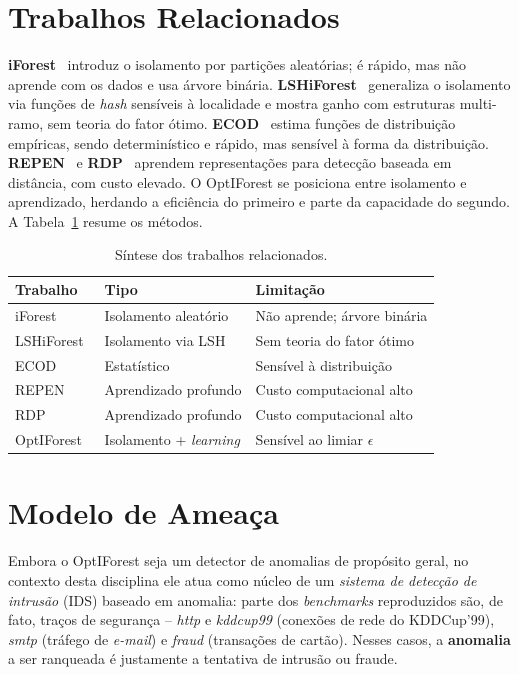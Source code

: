 \documentclass[conference]{IEEEtran}
\begin{document}
\section{Trabalhos Relacionados}

\textbf{iForest}~\cite{iforest} introduz o isolamento por parti\c{c}\~oes
aleat\'orias; \'e r\'apido, mas n\~ao aprende com os dados e usa \'arvore bin\'aria.
\textbf{LSHiForest}~\cite{lshiforest} generaliza o isolamento via fun\c{c}\~oes de
\emph{hash} sens\'iveis \`a localidade e mostra ganho com estruturas multi-ramo,
sem teoria do fator \'otimo. \textbf{ECOD}~\cite{ecod} estima fun\c{c}\~oes de
distribui\c{c}\~ao emp\'iricas, sendo determin\'istico e r\'apido, mas sens\'ivel \`a
forma da distribui\c{c}\~ao. \textbf{REPEN}~\cite{repen} e \textbf{RDP}~\cite{rdp}
aprendem representa\c{c}\~oes para detec\c{c}\~ao baseada em dist\^ancia, com custo
elevado. O OptIForest se posiciona entre isolamento e aprendizado, herdando a
efici\^encia do primeiro e parte da capacidade do segundo. A
Tabela~\ref{tab:related} resume os m\'etodos.

\begin{table}[h]
\centering
\caption{S\'intese dos trabalhos relacionados.}
\label{tab:related}
\footnotesize
\begin{tabular}{llp{2.4cm}}
\toprule
\textbf{Trabalho} & \textbf{Tipo} & \textbf{Limita\c{c}\~ao} \\
\midrule
iForest~\cite{iforest}      & Isolamento aleat\'orio & N\~ao aprende; \'arvore bin\'aria \\
LSHiForest~\cite{lshiforest}& Isolamento via LSH     & Sem teoria do fator \'otimo \\
ECOD~\cite{ecod}            & Estat\'istico          & Sens\'ivel \`a distribui\c{c}\~ao \\
REPEN~\cite{repen}          & Aprendizado profundo   & Custo computacional alto \\
RDP~\cite{rdp}              & Aprendizado profundo   & Custo computacional alto \\
OptIForest~\cite{optiforest}& Isolamento + \emph{learning} & Sens\'ivel ao limiar $\epsilon$ \\
\bottomrule
\end{tabular}
\end{table}

\section{Modelo de Ameaça}
Embora o OptIForest seja um detector de anomalias de prop\'osito geral, no contexto
desta disciplina ele atua como n\'ucleo de um \emph{sistema de detec\c{c}\~ao de
intrus\~ao} (IDS) baseado em anomalia: parte dos \emph{benchmarks} reproduzidos s\~ao,
de fato, tra\c{c}os de seguran\c{c}a -- \emph{http} e \emph{kddcup99} (conex\~oes de
rede do KDDCup'99), \emph{smtp} (tr\'afego de \emph{e-mail}) e \emph{fraud} (transa\c{c}\~oes
de cart\~ao). Nesses casos, a \textbf{anomalia} a ser ranqueada \'e justamente a
tentativa de intrus\~ao ou fraude.
\end{document}
